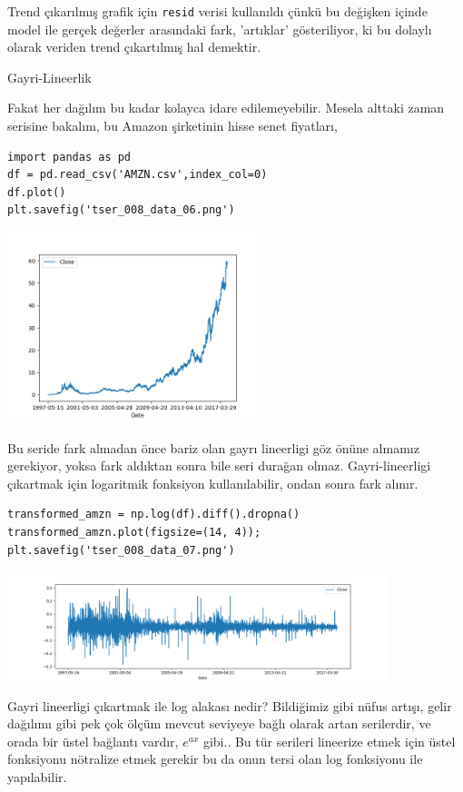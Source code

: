 \documentclass[12pt,fleqn]{article}\usepackage{../../common}
\begin{document}
Trend çıkarılmış grafik için \verb!resid! verisi kullanıldı çünkü bu değişken
içinde model ile gerçek değerler arasındaki fark, 'artıklar' gösteriliyor, ki bu
dolaylı olarak veriden trend çıkartılmış hal demektir.

Gayri-Lineerlik

Fakat her dağılım bu kadar kolayca idare edilemeyebilir. Mesela alttaki
zaman serisine bakalım, bu Amazon şirketinin hisse senet fiyatları,

\begin{verbatim}
import pandas as pd
df = pd.read_csv('AMZN.csv',index_col=0)
df.plot()
plt.savefig('tser_008_data_06.png')
\end{verbatim}

\includegraphics[width=20em]{tser_008_data_06.png}

Bu seride fark almadan önce bariz olan gayrı lineerligi göz önüne almamız
gerekiyor, yoksa fark aldıktan sonra bile seri durağan olmaz. Gayri-lineerligi
çıkartmak için logaritmik fonksiyon kullanılabilir, ondan sonra fark alınır.

\begin{verbatim}
transformed_amzn = np.log(df).diff().dropna()
transformed_amzn.plot(figsize=(14, 4));
plt.savefig('tser_008_data_07.png')
\end{verbatim}

\includegraphics[width=30em]{tser_008_data_07.png}

Gayri lineerligi çıkartmak ile log alakası nedir? Bildiğimiz gibi
nüfus artışı, gelir dağılımı gibi pek çok ölçüm mevcut seviyeye bağlı
olarak artan serilerdir, ve orada bir üstel bağlantı vardır, $e^{ax}$
gibi.. Bu tür serileri lineerize etmek için üstel fonksiyonu nötralize
etmek gerekir bu da onun tersi olan log fonksiyonu ile yapılabilir.
\end{document}
